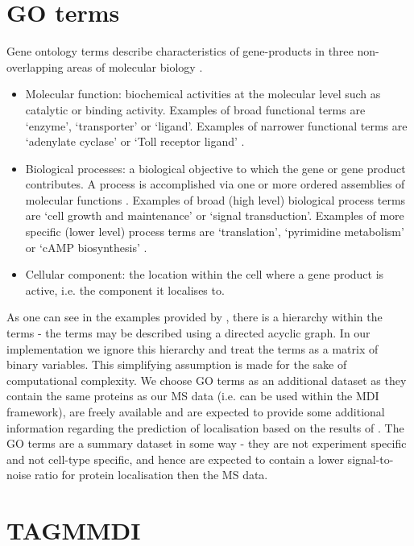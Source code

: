 \documentclass[11pt]{article} %
\begin{document}
\section{GO terms}
Gene ontology terms describe characteristics of gene-products in three non-overlapping areas of molecular biology \cite{GeneOntologyConsortiumGeneOntologyGO2004}.

\begin{itemize}
 \item Molecular function: biochemical activities at the molecular level such as catalytic or binding activity. Examples of broad functional terms are ‘enzyme’, ‘transporter’ or ‘ligand’. Examples of narrower functional terms are ‘adenylate cyclase’ or ‘Toll receptor ligand’ \cite{AshburnerGeneOntologytool2000}.
 \item Biological processes: a biological objective to which the gene or gene product contributes. A process is accomplished via one or more ordered assemblies of molecular functions \cite{AshburnerGeneOntologytool2000}. Examples of broad (high level) biological process terms are ‘cell growth and maintenance’ or ‘signal transduction’. Examples of more specific (lower level) process terms are ‘translation’, ‘pyrimidine metabolism’ or ‘cAMP biosynthesis’ \cite{AshburnerGeneOntologytool2000}.
 \item Cellular component: the location within the cell where a gene product is active, i.e. the component it localises to.
\end{itemize}
As one can see in the examples provided by \citet{AshburnerGeneOntologytool2000}, there is a hierarchy within the terms - the terms may be described using a directed acyclic graph. In our implementation we ignore this hierarchy and treat the terms as a matrix of binary variables. This simplifying assumption is made for the sake of computational complexity. We choose GO terms as an additional dataset as they contain the same proteins as our MS data (i.e. can be used within the MDI framework), are freely available and are expected to provide some additional information regarding the prediction of localisation based on the results of \citet{BreckelsLearningHeterogeneousData2016a}. The GO terms are a summary dataset in some way - they are not experiment specific and not cell-type specific, and hence are expected to contain a lower signal-to-noise ratio for protein localisation then the MS data.

\section{TAGMMDI}
\end{document}
